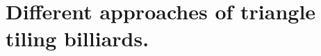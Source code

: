\documentclass[12pt]{article}
\theoremstyle{definition}
\begin{document}

\section{Different approaches of triangle tiling billiards.}\label{sec:definition}
\end{document}
